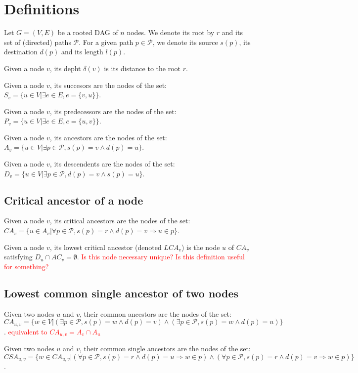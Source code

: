 \documentclass{paper}
\begin{document}
\section{Definitions}

Let $G=(V,E)$ be a rooted DAG of $n$ nodes. We denote its root by $r$ and its set of (directed) paths $\mathcal{P}$. For a given path $p\in\mathcal{P}$, we denote its source $s(p)$, its destination $d(p)$ and its length $l(p)$.

Given a node $v$, its depht $\delta(v)$ is its distance to the root $r$.

Given a node $v$, its succesors are the nodes of the set: $S_v=\{u\in V|\exists e\in E, e=\{v,u\}\}$.

Given a node $v$, its predecessors are the nodes of the set: $P_v=\{u\in V|\exists e\in E, e=\{u,v\}\}$.

Given a node $v$, its ancestors are the nodes of the set: $A_v=\{u\in V|\exists p\in \mathcal{P}, s(p)=v\wedge d(p)=u\}$.

Given a node $v$, its descendents are the nodes of the set: $D_v=\{u\in V|\exists p\in \mathcal{P}, d(p)=v\wedge s(p)=u\}$.

\subsection{Critical ancestor of a node}

Given a node $v$, its critical ancestors are the nodes of the set: $CA_v=\{u\in A_v|\forall p\in \mathcal{P}, s(p)=r\wedge d(p)=v\Rightarrow u\in p\}$. 

Given a node $v$, its lowest critical ancestor (denoted $LCA_v$) is the node $u$ of $CA_v$ satisfying $D_u\cap AC_v=\emptyset$. \textcolor{red}{Is this node necessary unique? Is this definition useful for something?}

\subsection{Lowest common single ancestor of two nodes}

Given two nodes $u$ and $v$, their common ancestors are the nodes of the set: $CA_{u,v}=\{w\in V|(\exists p\in\mathcal{P},s(p)=w\wedge d(p)=v)\wedge(\exists p\in\mathcal{P},s(p)=w\wedge d(p)=u)\}$. \textcolor{red}{equivalent to $CA_{u,v}=A_v\cap A_u$}

Given two nodes $u$ and $v$, their common single ancestors are the nodes of the set: $CSA_{u,v}=\{w\in CA_{u,v}|(\forall p\in\mathcal{P},s(p)=r\wedge d(p)=u\Rightarrow w\in p)\wedge(\forall p\in\mathcal{P},s(p)=r\wedge d(p)=v\Rightarrow w\in p) \}$.
\end{document}
